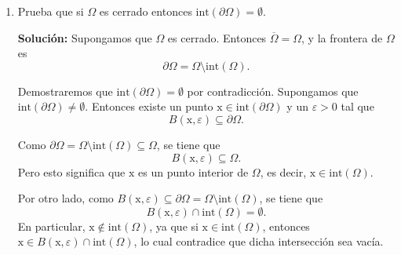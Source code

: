\documentclass[12pt]{article}
\newcommand{\Int}{\mathrm{int}}
\newcommand{\N}{\mathbb N}
\newcommand{\R}{\mathbb R}
\newcommand{\x}{\mathrm x}
\begin{document}
\begin{enumerate}
\begin{itemize}
    \item \textbf{Caso 2:} $x_0 = y_0^2$. Entonces $(x_0, y_0)$ está sobre la parábola. Debemos demostrar que es un punto de acumulación de $\Omega$. Para ello, construiremos una sucesión de puntos en $\Omega$ que converja a $(x_0, y_0)$.
    
    Para cada $k \in \N$, definimos
    \[
    (x_k, y_k) = \left(x_0 + \frac{1}{k}, y_0\right).
    \]
    Observamos que
    \[
    x_k = x_0 + \frac{1}{k} = y_0^2 + \frac{1}{k} > y_0^2 = y_k^2,
    \]
    por lo que $(x_k, y_k) \in \Omega$ para toda $k \in \N$. Además,
    \[
    \lim_{k \to \infty} (x_k, y_k) = \lim_{k \to \infty} \left(x_0 + \frac{1}{k}, y_0\right) = (x_0, y_0).
    \]
    Por lo tanto, $(x_0, y_0)$ es un punto de acumulación de $\Omega$, y así $(x_0, y_0) \in \overline{\Omega}$.
\end{itemize}

En ambos casos, $(x_0, y_0) \in \overline{\Omega}$, lo que demuestra que
\[
\{ (x,y)\in \R^2 : x \geq y^2 \} \subseteq \overline{\Omega}.
\]

Combinando ambas contenciones, concluimos que
\[
\overline{\Omega} = \{ (x,y)\in \R^2 : x \geq y^2 \}.
\]

\item Prueba que si $\Omega$ es cerrado entonces 
$\Int(\partial \Omega)=\emptyset$.

\textbf{Solución: }
Supongamos que $\Omega$ es cerrado. Entonces $\overline{\Omega} = \Omega$, y la frontera de $\Omega$ es
\[
\partial \Omega = \Omega \setminus \Int(\Omega).
\]

Demostraremos que $\Int(\partial \Omega) = \emptyset$ por contradicción.
Supongamos que $\Int(\partial \Omega) \neq \emptyset$. Entonces existe un punto $\x \in \Int(\partial \Omega)$ y un $\varepsilon > 0$ tal que
\[
B(\x, \varepsilon) \subseteq \partial \Omega.
\]

Como $\partial \Omega = \Omega \setminus \Int(\Omega) \subseteq \Omega$, se tiene que
\[
B(\x, \varepsilon) \subseteq \Omega.
\]
Pero esto significa que $\x$ es un punto interior de $\Omega$, es decir, $\x \in \Int(\Omega)$.

Por otro lado, como $B(\x, \varepsilon) \subseteq \partial \Omega = \Omega \setminus \Int(\Omega)$, se tiene que
\[
B(\x, \varepsilon) \cap \Int(\Omega) = \emptyset.
\]
En particular, $\x \notin \Int(\Omega)$, ya que si $\x \in \Int(\Omega)$, entonces $\x \in B(\x, \varepsilon) \cap \Int(\Omega)$, lo cual contradice que dicha intersección sea vacía.


\end{enumerate}
\end{document}
